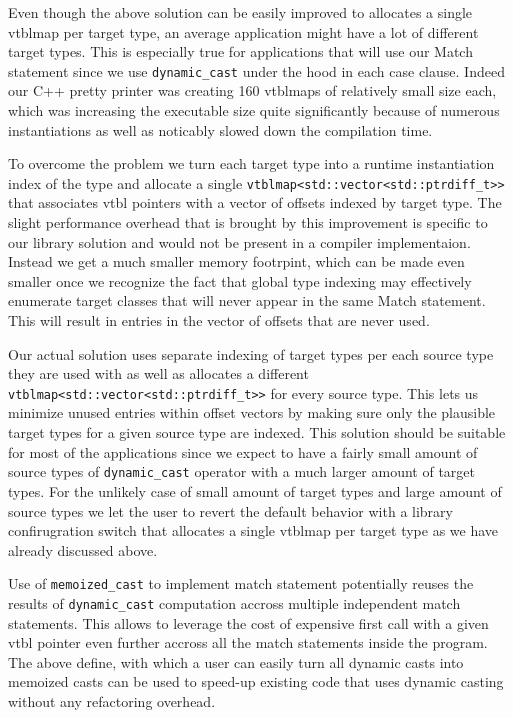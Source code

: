 \documentclass[preprint]{sigplanconf}
\makeatletter
\DeclareRobustCommand{\code}[1]{{\lstinline[breaklines=false,escapechar=@]{#1}}}
\makeatother
\begin{document}
Even though the above solution can be easily improved to allocates a single 
vtblmap per target type, an average application might have a lot of different 
target types. This is especially true for applications that will use our Match 
statement since we use \code{dynamic_cast} under the hood in each case clause. 
Indeed our C++ pretty printer was creating 160 vtblmaps of relatively small size 
each, which was increasing the executable size quite significantly because of 
numerous instantiations as well as noticably slowed down the compilation time.

To overcome the problem we turn each target type into a runtime instantiation 
index of the type and allocate a single \code{vtblmap<std::vector<std::ptrdiff_t>>} 
that associates vtbl pointers with a vector of offsets indexed by target type. 
The slight performance overhead that is brought by this improvement is specific 
to our library solution and would not be present in a compiler implementaion. 
Instead we get a much smaller memory footrpint, which can be made even smaller 
once we recognize the fact that global type indexing may effectively enumerate 
target classes that will never appear in the same Match statement. This will 
result in entries in the vector of offsets that are never used.

Our actual solution uses separate indexing of target types per each source type 
they are used with as well as allocates a different 
\code{vtblmap<std::vector<std::ptrdiff_t>>} for every source type. This lets us 
minimize unused entries within offset vectors by making sure only the plausible 
target types for a given source type are indexed. This solution should be 
suitable for most of the applications since we expect to have a fairly small 
amount of source types of \code{dynamic_cast} operator with a much larger amount 
of target types. For the unlikely case of small amount of target types and large 
amount of source types we let the user to revert the default behavior with a 
library confirugration switch that allocates a single vtblmap per target type as 
we have already discussed above.

Use of \code{memoized_cast} to implement match statement potentially reuses the 
results of \code{dynamic_cast} computation accross multiple independent match 
statements. This allows to leverage the cost of expensive first call with a 
given vtbl pointer even further accross all the match statements inside the 
program. The above define, with which a user can easily turn all dynamic casts 
into memoized casts can be used to speed-up existing code that uses dynamic 
casting without any refactoring overhead.
\end{document}
